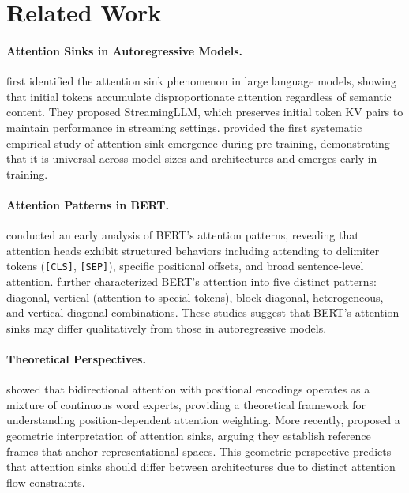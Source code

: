 \documentclass{article}
\begin{document}
\section{Related Work}

\paragraph{Attention Sinks in Autoregressive Models.}
\citet{xiao2023efficient} first identified the attention sink phenomenon in large language models, showing that initial tokens accumulate disproportionate attention regardless of semantic content. They proposed StreamingLLM, which preserves initial token KV pairs to maintain performance in streaming settings. \citet{gu2024attention} provided the first systematic empirical study of attention sink emergence during pre-training, demonstrating that it is universal across model sizes and architectures and emerges early in training.

\paragraph{Attention Patterns in BERT.}
\citet{clark2019what} conducted an early analysis of BERT's attention patterns, revealing that attention heads exhibit structured behaviors including attending to delimiter tokens (\texttt{[CLS]}, \texttt{[SEP]}), specific positional offsets, and broad sentence-level attention. \citet{kovaleva2019revealing} further characterized BERT's attention into five distinct patterns: diagonal, vertical (attention to special tokens), block-diagonal, heterogeneous, and vertical-diagonal combinations. These studies suggest that BERT's attention sinks may differ qualitatively from those in autoregressive models.

\paragraph{Theoretical Perspectives.}
\citet{wibisono2023bidirectional} showed that bidirectional attention with positional encodings operates as a mixture of continuous word experts, providing a theoretical framework for understanding position-dependent attention weighting. More recently, \citet{ruscio2025geometric} proposed a geometric interpretation of attention sinks, arguing they establish reference frames that anchor representational spaces. This geometric perspective predicts that attention sinks should differ between architectures due to distinct attention flow constraints.
\end{document}
